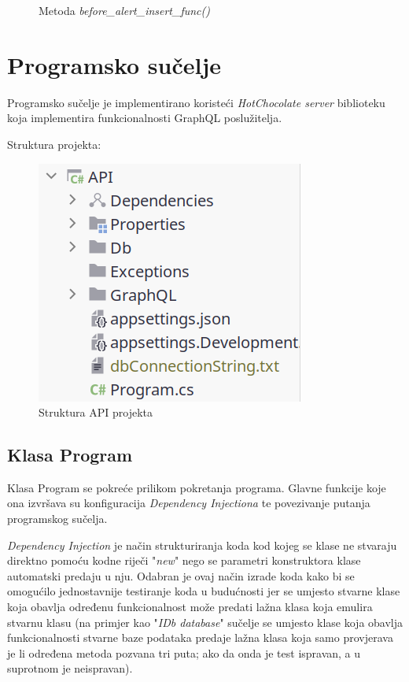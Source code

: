 \documentclass[zavrsnirad]{fer}
\begin{document}
\begin{figure}[htb]
	\centering
	
	\caption{Metoda \textit{before\_alert\_insert\_func()}}
\end{figure}
\FloatBarrier

\chapter{Programsko sučelje}
Programsko sučelje je implementirano koristeći \textit{HotChocolate server} biblioteku koja implementira funkcionalnosti GraphQL poslužitelja.

Struktura projekta:
\begin{figure}[htb]
	\centering
	\includegraphics[width=0.4\linewidth]{images/api_structure.png} 
	\caption{Struktura API projekta}
	\label{slk:api_structure}
\end{figure}
\FloatBarrier

\section{Klasa Program}
Klasa Program se pokreće prilikom pokretanja programa. Glavne funkcije koje ona izvršava su konfiguracija \textit{Dependency Injectiona} te povezivanje putanja programskog sučelja.

\textit{Dependency Injection} je način strukturiranja koda kod kojeg se klase ne stvaraju direktno pomoću kodne riječi "\textit{new}" nego se parametri konstruktora klase automatski predaju u nju. Odabran je ovaj način izrade koda kako bi se omogućilo jednostavnije testiranje koda u budućnosti jer se umjesto stvarne klase koja obavlja određenu funkcionalnost može predati lažna klasa koja emulira stvarnu klasu (na primjer kao "\textit{IDb database}" sučelje se umjesto klase koja obavlja funkcionalnosti stvarne baze podataka predaje lažna klasa koja samo provjerava je li određena metoda pozvana tri puta; ako da onda je test ispravan, a u suprotnom je neispravan).
\end{document}
